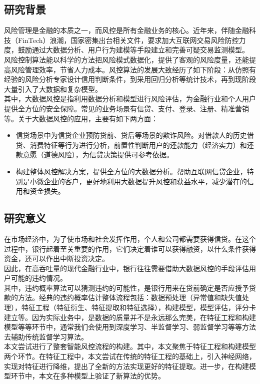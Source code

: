 \subsection{研究背景}
风险管理是金融的本质之一，而风控是所有金融业务的核心。近年来，伴随金融科技（FinTech）浪潮，国家密集出台相关文件，要求加大互联网交易风险防控力度，鼓励通过大数据分析、用户行为建模等手段建立和完善可疑交易监测模型。\\

风险控制算法能以科学的方法把风险模式数据化，提供了客观的风险度量，还能提高风险管理效率，节省人力成本。风控算法的发展大致经历了如下阶段：从仿照有经验的风险分析专家设计信用判断条件，到采用回归分析等统计技术，再到现阶段大量引入了大数据和复杂模型。\\

其中，大数据风控是指利用数据分析和模型进行风险评估，为金融行业和个人用户提供全方位的安全保障。常见的业务场景有信贷、支付、登录、注册、精准营销等。关于大数据风控的应用，主要有如下两方面：
\begin{itemize}
\item 信贷场景中为信贷企业预防贷前、贷后等场景的欺诈风险。对借款人的历史借贷、消费特征等行为进行分析，前置性判断用户的还款能力（经济实力）和还款意愿（道德风险），为信贷决策提供可参考依据。
\item 构建整体风控解决方案，提供全方位的大数据分析。帮助互联网信贷企业，特别是小微企业的客户，更好地利用大数据提升风控和获益水平，减少潜在的信用和资金损失。
\end{itemize}


\subsection{研究意义}
在市场经济中，为了使市场和社会发挥作用，个人和公司都需要获得信贷。在这个过程中，银行起着至关重要的作用，它们决定着谁可以获得融资，以什么条件获得资金，还可以作出中断投资决定。 \\

因此，在高吞吐量的现代金融行业中，银行往往需要借助大数据风控的手段评估用户可能的违约情况。 \\

其中，违约概率算法可以猜测违约的可能性，是银行用来在贷前确定是否应授予贷款的方法。经典的违约概率估计整体流程包括：数据预处理（异常值和缺失值处理），特征工程（特征衍生、特征提取和特征选择），构建模型，模型评估，评分卡建立等。因为实际业务中，是数据的质量并不是永远那么完美，在特征工程和构建模型等等环节中，通常我们会使用到深度学习、半监督学习、弱监督学习等等方法去辅助传统监督学习算法。\\

本文尝试进行了整套智能风控流程的构建。其中，本文聚焦于特征工程和构建模型两个环节。在特征工程中，本文尝试在传统的特征工程的基础上，引入神经网络，实现对特征进行降维，提出了全新的方法实现更好的特征提取。进一步，在构建模型环节中，本文在多种模型上验证了新算法的优势。